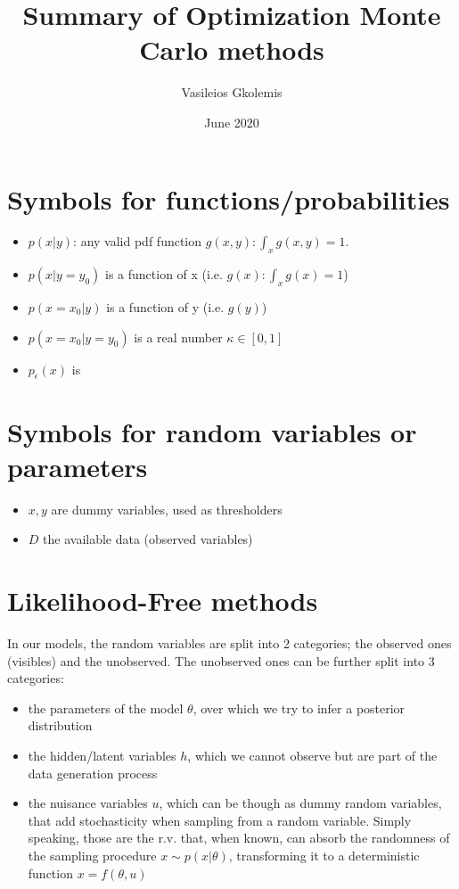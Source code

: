 \documentclass{article}
\title{Summary of Optimization Monte Carlo methods}
\author{Vasileios Gkolemis}
\date{June 2020}
\begin{document}
\maketitle

\section{Symbols for functions/probabilities}

\begin{itemize}
    \item $p(x|y)$: any valid pdf function $g(x,y): \int_x g(x,y) = 1$. 
    \item $p(x|y=y_0)$ is a function of x (i.e. $g(x): \int_x g(x) = 1$)  
    \item $p(x=x_0|y)$ is a function of y (i.e. $g(y)$) 
    \item $p(x=x_0|y=y_0)$ is a real number $\kappa \in [0,1]$
    \item $p_\epsilon(x)$ is 
\end{itemize}

\section{Symbols for random variables or parameters}

\begin{itemize}
    \item $x, y$ are dummy variables, used as thresholders
    \item $D$ the available data (observed variables)
\end{itemize}



\section{Likelihood-Free methods}

In our models, the random variables are split into 2 categories; the observed ones (visibles) and the unobserved. The unobserved ones can be further split into 3 categories:

\begin{itemize}
    \item the parameters of the model $\theta$, over which we try to infer a posterior distribution
    \item the hidden/latent variables $h$, which we cannot observe but are part of the data generation process
    \item the nuisance variables $u$, which can be though as dummy random variables, that add stochasticity when sampling from a random variable. Simply speaking, those are the r.v. that, when known, can absorb the randomness of the sampling procedure $x \sim p(x|\theta)$, transforming it to a deterministic function $x = f(\theta, u)$
\end{itemize}
\end{document}
